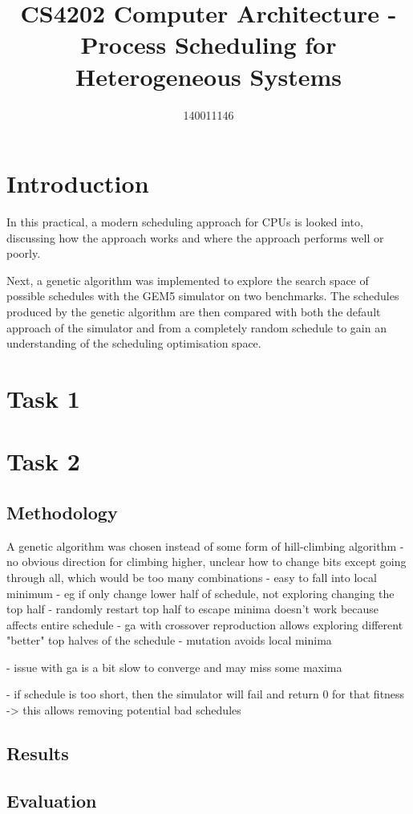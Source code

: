\documentclass{article}
\title{CS4202 Computer Architecture - Process Scheduling for Heterogeneous Systems}
\author{140011146}
\begin{document}
\maketitle

\section{Introduction}


In this practical, a modern scheduling approach for CPUs is looked into, discussing how the approach works and where the approach performs well or poorly. 

Next, a genetic algorithm was implemented to explore the search space of possible schedules with the GEM5 simulator on two benchmarks. The schedules produced by the genetic algorithm are then compared with both the default approach of the simulator and from a completely random schedule to gain an understanding of the scheduling optimisation space.

\section{Task 1}

\section{Task 2}

\subsection{Methodology}
A genetic algorithm was chosen instead of some form of hill-climbing algorithm
- no obvious direction for climbing  higher, unclear how to change bits except going through all, which would be too many combinations
- easy to fall into local minimum 
- eg if only change lower half of schedule, not exploring changing the top half
- randomly restart top half to escape minima doesn't work because affects entire schedule
- ga with crossover reproduction allows exploring different "better" top halves of the schedule
- mutation avoids local minima

- issue with ga is a bit slow to converge and may miss some maxima



- if schedule is too short, then the simulator will fail and return 0 for that fitness -> this allows removing potential bad schedules

\subsection{Results}

\subsection{Evaluation}
\end{document}

